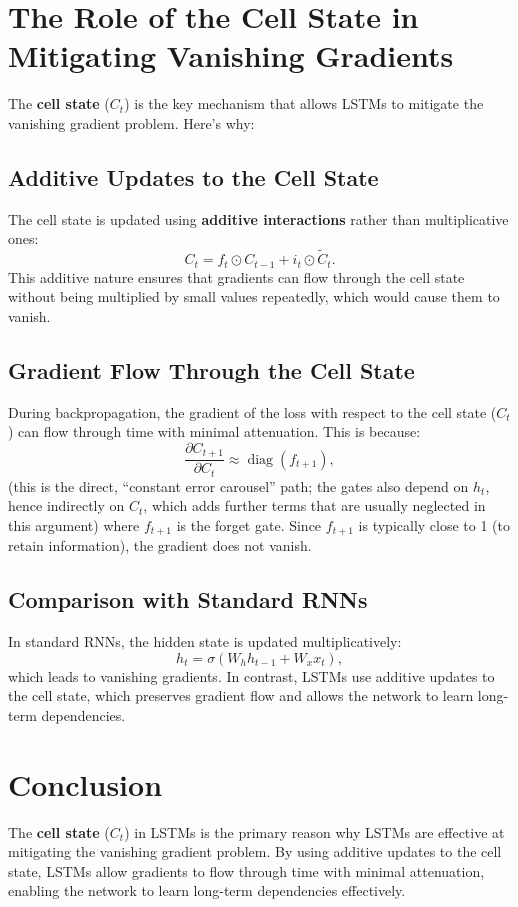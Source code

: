 \begin{notechapter}
\section{The Role of the Cell State in Mitigating Vanishing Gradients}
The \textbf{cell state} (\(C_t\)) is the key mechanism that allows
LSTMs to mitigate the vanishing gradient problem. Here's why:

\subsection{Additive Updates to the Cell State}
The cell state is updated using \textbf{additive interactions} rather
than multiplicative ones:
\[
C_t = f_t \odot C_{t-1} + i_t \odot \tilde{C}_t.
\]
This additive nature ensures that gradients can flow through the cell
state without being multiplied by small values repeatedly, which
would cause them to vanish.

\subsection{Gradient Flow Through the Cell State}
During backpropagation, the gradient of the loss with respect to the
cell state (\(C_t\)) can flow through time with minimal attenuation.
This is because:
\[
\frac{\partial C_{t+1}}{\partial C_t} \approx \operatorname{diag}(f_{t+1}),
\]
(this is the direct, ``constant error carousel'' path; the gates also depend on \( h_t \), hence
indirectly on \( C_t \), which adds further terms that are usually neglected in this argument)
where \(f_{t+1}\) is the forget gate. Since \(f_{t+1}\) is typically
close to 1 (to retain information), the gradient does not vanish.

\subsection{Comparison with Standard RNNs}
In standard RNNs, the hidden state is updated multiplicatively:
\[
h_t = \sigma(W_h h_{t-1} + W_x x_t),
\]
which leads to vanishing gradients. In contrast, LSTMs use additive
updates to the cell state, which preserves gradient flow and allows
the network to learn long-term dependencies.

\section{Conclusion}
The \textbf{cell state} (\(C_t\)) in LSTMs is the primary reason why
LSTMs are effective at mitigating the vanishing gradient problem. By
using additive updates to the cell state, LSTMs allow gradients to
flow through time with minimal attenuation, enabling the network to
learn long-term dependencies effectively.
\end{notechapter}

